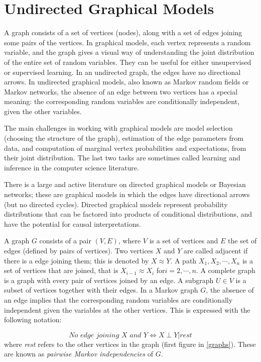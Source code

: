 \section{Undirected Graphical Models}
A graph consists of a set of vertices (nodes), along with a set of edges joining some pairs of the vertices. In graphical models, each vertex represents a random variable, and the graph gives a visual way of understanding the joint distribution of the entire set of random variables. They can be useful for either unsupervised or supervised learning. In an undirected graph, the edges have no directional arrows. In undirected graphical models, also known as Markov random fields or Markov networks, the absence of an edge between two vertices has a special meaning: the corresponding random variables are conditionally independent, given the other variables.

The main challenges in working with graphical models are model selection (choosing the structure of the graph), estimation of the edge parameters from data, and computation of marginal vertex probabilities and expectations, from their joint distribution. The last two tasks are sometimes called learning and inference in the computer science literature.

There is a large and active literature on directed graphical models or Bayesian networks; these are graphical models in which the edges have directional arrows (but no directed cycles). Directed graphical models represent probability distributions that can be factored into products of conditional distributions, and have the potential for causal interpretations.

 A graph $G$ consists of a pair $(V, E)$, where $V$ is a set of vertices and $E$ the set of edges (defined by pairs of vertices). Two vertices $X$ and $Y$ are called adjacent if there is a edge joining them; this is denoted by $X \approx Y$. A path $X_1,X_2,\cdots,X_n$ is a set of vertices that are joined, that is $X_{i-1} \approx X_i$ for$ i = 2,\cdots,n$. A complete graph is a graph with every pair of vertices joined by an edge. A subgraph $U \in V$ is a subset of vertices together with their edges.
In a Markov graph $G$, the absence of an edge implies that the corresponding random variables are conditionally independent given the variables at the other vertices. This is expressed with the following notation:

\begin{equation}
\textit{No edge joining $X$ and $Y$} \Longleftrightarrow  X \perp Y|rest
\end{equation}
where \textit{rest} refers to the other vertices in the graph (first figure in \autoref{graphs}). These are known as \textit{pairwise Markov independencies} of $G$.

